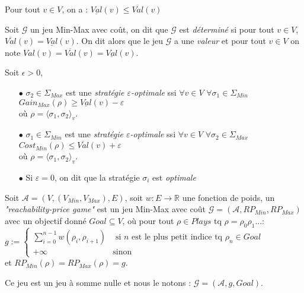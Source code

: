 \begin{propriete}
	Pour tout $v \in V$, on a : $\underline{Val}(v) \leq \overline{Val}(v)$
\end{propriete}


\begin{defi}
		Soit $\mathcal{G}$ un jeu Min-Max avec coût, on dit que $\mathcal{G}$ est \textit{déterminé} si pour tout $v \in V$, $\overline{Val}(v) = \underline{Val}(v)$. On dit alors que le jeu $\mathcal{G}$ a une \textit{valeur} et pour tout $v \in V$ on note $Val(v) = \overline{Val}(v) = \underline{Val}(v)$.
\end{defi}


\begin{defi}
	Soit $\epsilon > 0$,
	\begin{enumerate}
	\item[$\bullet$] $\sigma _{2} \in \Sigma _{Max}$ est une \textit{stratégie $\varepsilon$-optimale} ssi $\forall v \in V $ $ \forall \sigma _{1}\in \Sigma_{Min}$ $ Gain_{Max}(\rho) \geq \underline{Val}(v) - \varepsilon  $\\ où $\rho = \langle \sigma _{1},\sigma _{2} \rangle_v$.
	\item[$\bullet$] $\sigma _{1} \in \Sigma _{Min}$ est une \textit{stratégie $\varepsilon$-optimale} ssi $\forall v \in V $ $ \forall \sigma _{2}\in \Sigma_{Max}$ $Cost_{Min}(\rho) \leq \overline{Val}(v) + \varepsilon $\\ où $\rho = \langle \sigma _{1},\sigma _{2} \rangle_v$.
	\item[$\bullet$] Si $\varepsilon = 0$, on dit que la stratégie $\sigma _{i}$ est \textit{optimale}
	\end{enumerate}
\end{defi}


\begin{defi}
	Soit $\mathcal{A} = (V, (V_{Min}, V_{Max}), E) $, soit $w: E \rightarrow \mathbb{R}$ une fonction de poids,
	un \textit{"reachability-price game"} est un jeu Min-Max avec coût $\mathcal{G} = (\mathcal{A},RP_{Min},RP_{Max})$\\ avec un objectif donné $Goal \subseteq V$, où pour tout $\rho \in Plays$ tq $\rho = \rho _{0}\rho _{1}...$:\\
	
	$g :=\begin{cases}
									\sum_{i = 0}^{n-1} w(\rho_{i},\rho_{i+1}) & \text{ si } n \text{ est le plus petit indice tq } \rho_{n}\in 					  Goal\\
									+\infty & \text{sinon}
									\end{cases}$ \\
	et $RP_{Min}(\rho)=RP_{Max}(\rho) = g$.
									
  \noindent Ce jeu est un jeu à somme nulle et nous le notons : $\mathcal{G} = (\mathcal{A}, g , Goal)$.
\end{defi}

